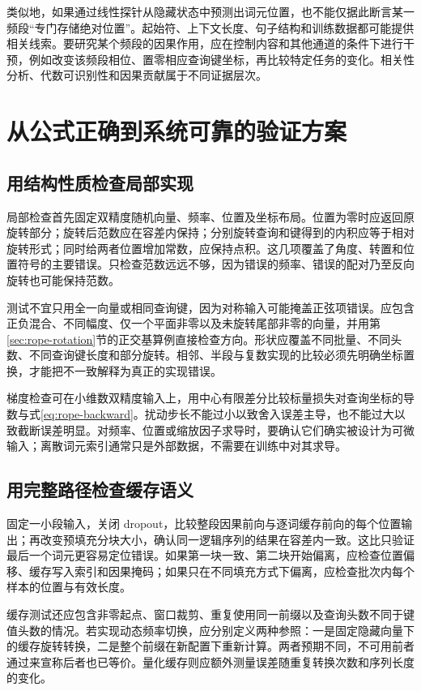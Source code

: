 \documentclass[UTF8,12pt,a4paper,fontset=fandol]{ctexart}
\begin{document}
类似地，如果通过线性探针从隐藏状态中预测出词元位置，也不能仅据此断言某一频段“专门存储绝对位置”。起始符、上下文长度、句子结构和训练数据都可能提供相关线索。要研究某个频段的因果作用，应在控制内容和其他通道的条件下进行干预，例如改变该频段相位、置零相应查询键坐标，再比较特定任务的变化。相关性分析、代数可识别性和因果贡献属于不同证据层次。

\section{从公式正确到系统可靠的验证方案}
\label{sec:rope-validation}

\subsection{用结构性质检查局部实现}
局部检查首先固定双精度随机向量、频率、位置及坐标布局。位置为零时应返回原旋转部分；旋转后范数应在容差内保持；分别旋转查询和键得到的内积应等于相对旋转形式；同时给两者位置增加常数，应保持点积。这几项覆盖了角度、转置和位置符号的主要错误。只检查范数远远不够，因为错误的频率、错误的配对乃至反向旋转也可能保持范数。

测试不宜只用全一向量或相同查询键，因为对称输入可能掩盖正弦项错误。应包含正负混合、不同幅度、仅一个平面非零以及未旋转尾部非零的向量，并用第\ref{sec:rope-rotation}节的正交基算例直接检查方向。形状应覆盖不同批量、不同头数、不同查询键长度和部分旋转。相邻、半段与复数实现的比较必须先明确坐标置换，才能把不一致解释为真正的实现错误。

梯度检查可在小维数双精度输入上，用中心有限差分比较标量损失对查询坐标的导数与式\eqref{eq:rope-backward}。扰动步长不能过小以致舍入误差主导，也不能过大以致截断误差明显。对频率、位置或缩放因子求导时，要确认它们确实被设计为可微输入；离散词元索引通常只是外部数据，不需要在训练中对其求导。

\subsection{用完整路径检查缓存语义}
固定一小段输入，关闭 dropout，比较整段因果前向与逐词缓存前向的每个位置输出；再改变预填充分块大小，确认同一逻辑序列的结果在容差内一致。这比只验证最后一个词元更容易定位错误。如果第一块一致、第二块开始偏离，应检查位置偏移、缓存写入索引和因果掩码；如果只在不同填充方式下偏离，应检查批次内每个样本的位置与有效长度。

缓存测试还应包含非零起点、窗口裁剪、重复使用同一前缀以及查询头数不同于键值头数的情况。若实现动态频率切换，应分别定义两种参照：一是固定隐藏向量下的缓存旋转转换，二是整个前缀在新配置下重新计算。两者预期不同，不可用前者通过来宣称后者也已等价。量化缓存则应额外测量误差随重复转换次数和序列长度的变化。
\end{document}
